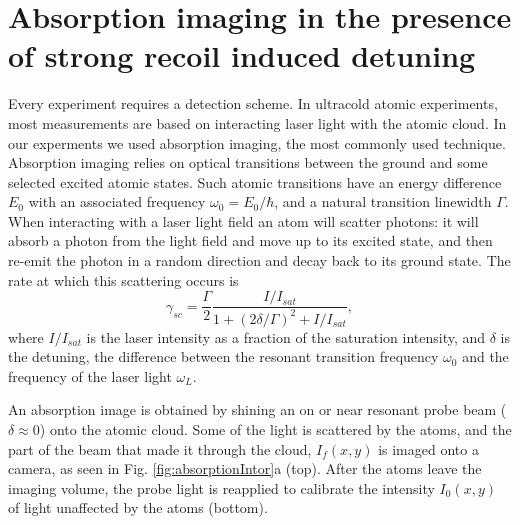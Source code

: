 \documentclass[12pt]{iopart}
\begin{document}
\section{Absorption imaging in the presence of strong recoil induced detuning}
Every experiment requires a detection scheme. In ultracold atomic experiments, most measurements are based on interacting laser light with the atomic cloud. In our experments we used absorption imaging, the most commonly used technique. Absorption imaging relies on optical transitions between the ground and some selected excited atomic states. Such atomic transitions have an energy difference $E_0$ with an associated frequency $\omega_0 = E_0/\hbar$, and a natural transition linewidth $\Gamma$. When interacting with a laser light field an atom will scatter photons: it will absorb a photon from the light field and move up to its excited state, and then re-emit the photon in a random direction and decay back to its ground state. The  rate at which this scattering occurs is
\begin{equation}
\gamma_{sc}= \frac{\Gamma}{2} \frac{I/I_{sat}}{1+(2\delta/\Gamma)^2 +I/I_{sat}}, 
\label{eq:scatrate}
\end{equation}
where $I/I_{sat}$ is the laser intensity as a fraction of the saturation intensity, and $\delta$ is the detuning, the difference between the resonant transition frequency $\omega_0$ and the frequency of the laser light $\omega_L$.  
\par An absorption image is obtained by shining an on or near resonant probe beam ($\delta\approx0$) onto the atomic cloud. Some of the light is scattered by the atoms, and the part of the beam that made it through the cloud, $I_f(x,y)$ is imaged onto a camera, as seen in Fig. \ref{fig:absorptionIntor}a (top). After the atoms leave the imaging volume, the probe light is reapplied to calibrate the intensity $I_0(x,y)$ of light unaffected by the atoms (bottom). 
\end{document}
